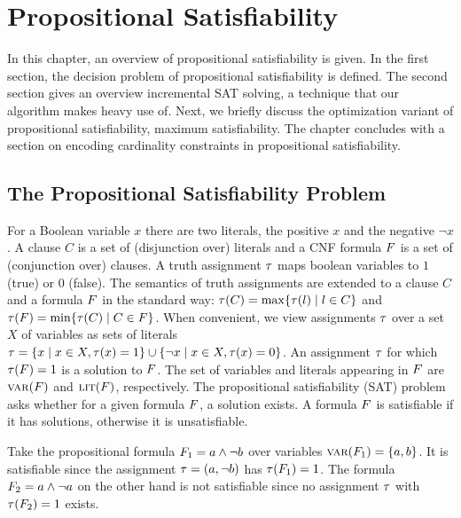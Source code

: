 \chapter{Propositional Satisfiability\label{chap:satisfiability}}

In this chapter, an overview of propositional satisfiability is given.
In the first section, the decision problem of propositional satisfiability is defined.
The second section gives an overview incremental SAT solving, a technique that our algorithm makes heavy use of.
Next, we briefly discuss the optimization variant of propositional satisfiability, maximum satisfiability.
The chapter concludes with a section on encoding cardinality constraints in propositional satisfiability.

\section{The Propositional Satisfiability Problem\label{sec:sat}}

For a Boolean variable $x$ there are two literals, the positive $x$ and the negative $\lnot x$. 
A clause $C$ is a set of (disjunction over) literals and a CNF formula $F$ is a set of (conjunction over) clauses.
A truth assignment $\tau$ maps boolean variables to $1$ (true) or $0$ (false).
The semantics of truth assignments are extended to a clause $C$ and a formula $F$ in the standard way: $\tau(C) = \max\{ \tau(l) \mid l \in C\}$ and $\tau(F) = \min\{\tau(C) \mid C \in F\}$.
When convenient, we view assignments $\tau$ over a set $X$ of variables as sets of literals $\tau = \{ x \mid x \in X,  \tau(x) = 1\} \cup \{ \lnot x \mid x \in X, \tau(x) = 0\}$.
An assignment $\tau$ for which $\tau(F) = 1$ is a solution to $F$.
The set of variables and literals appearing in $F$ are $\textsc{var}(F)$ and $\textsc{lit}(F)$, respectively.  
The propositional satisfiability (SAT) problem asks whether for a given formula $F$, a solution exists.
A formula $F$ is satisfiable if it has solutions, otherwise it is unsatisfiable.

\begin{example}
  Take the propositional formula $F_1 = a \land \lnot b$ over variables $\textsc{var}(F_1) = \{a,b\}$.
  It is satisfiable since the assignment $\tau=(a,\lnot b)$ has $\tau(F_1)=1$.
  The formula $F_2 = a \land \lnot a$ on the other hand is not satisfiable since no assignment $\tau$ with $\tau(F_2)=1$ exists.
\end{example}

